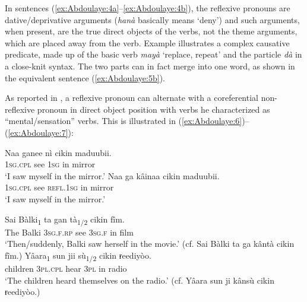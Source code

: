 \documentclass[output=paper]{langscibook}
\begin{document}
In sentences (\ref{ex:Abdoulaye:4a}--\ref{ex:Abdoulaye:4b}), the reflexive pronouns are dative/deprivative arguments (\textit{hanà} basically means ‘deny’) and such arguments, when present, are the true direct objects of the verbs, not the theme arguments, which are placed away from the verb. Example  illustrates a complex causative predicate, made up of the basic verb \textit{mayà} ‘replace, repeat’ and the particle \textit{dà} in a close-knit syntax. The two parts can in fact merge into one word, as shown in the equivalent sentence (\ref{ex:Abdoulaye:5b}).

As reported in \citet[524]{Newman2000}, a reflexive pronoun can alternate with a coreferential non-reflexive pronoun in direct object position with verbs he characterized as “mental/sensation” verbs. This is illustrated in (\ref{ex:Abdoulaye:6})--(\ref{ex:Abdoulaye:7}):


\ea%
    \label{ex:Abdoulaye:6}
    \ea \label{ex:Abdoulaye:6a}
    \gll Naa  ganee  nì  cikin  maduubii.\\
     \textsc{1sg.cpl}  see  \textsc{1sg}  in  mirror\\
    \glt  `I saw myself in the mirror.’
    \ex  \label{ex:Abdoulaye:6b}
    \gll  Naa  ga  kâinaa  cikin  maduubii.\\
    \textsc{1sg.cpl}  see  \textsc{refl.1sg}  in  mirror\\
    \glt `I saw myself in the mirror.’
    \z
\z 



\ea%
    \label{ex:Abdoulaye:7}
    \ea   \label{ex:Abdoulaye:7a}
    \gll Sai  Bàlki\textsubscript{1}  ta  gan  tà\textsubscript{1/2}  cikin  fîm.\\
    The  Balki  \textsc{3sg.f.rp}  see  \textsc{3sg.f}  in  film\\
     \glt `Then/suddenly, Balki saw herself in the movie.’ (cf. Sai Bàlki ta ga kântà cikin fîm.)
    \ex \label{ex:Abdoulaye:7b}
   \gll  Yâara\textsubscript{1}  sun  jii  sù\textsubscript{1/2}  cikin  ɍeediyòo.\\
    children  \textsc{3pl.cpl}  hear  \textsc{3pl}  in  radio\\
    \glt `The children heard themselves on the radio.’ (cf. Yâara sun ji kânsù cikin ɍeediyòo.)
    \z
\z 
\end{document}
